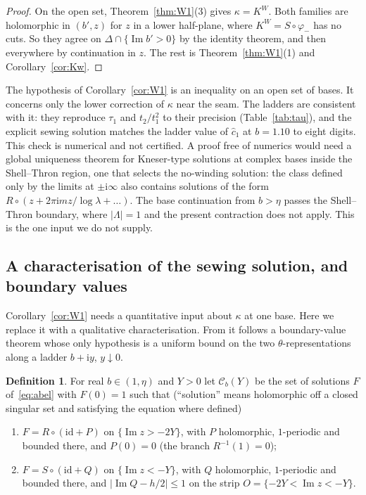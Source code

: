 \documentclass[11pt,a4paper]{article}
\theoremstyle{definition}
\newtheorem{definition}[theorem]{Definition}
\newcommand{\Rr}{R}
\newcommand{\Kk}{K}
\newcommand{\ii}{\mathrm{i}}
\begin{document}
\begin{proof}
On the open set, Theorem~\ref{thm:W1}(3) gives $\kappa=\Kk^W$.  Both families
are holomorphic in $(b',z)$ for $z$ in a lower half-plane, where $\Kk^W=S\circ\varphi_-$
has no cuts.  So they agree on $\Delta\cap\{\operatorname{Im}b'>0\}$ by the
identity theorem, and then everywhere by continuation in $z$.  The rest is Theorem~\ref{thm:W1}(1) and
Corollary~\ref{cor:Kw}.
\end{proof}

The hypothesis of Corollary~\ref{cor:W1} is an inequality on an open set of bases.  It
concerns only the lower correction of $\kappa$ near the seam.  The ladders
are consistent with it: they reproduce $\tau_1$ and $t_2/t_1^2$ to their
precision (Table~\ref{tab:tau}), and the explicit sewing solution matches the
ladder value of $\hat c_1$ at $b=1.10$ to eight digits.  This check is
numerical and not certified.  A proof free of numerics would need a global uniqueness theorem
for Kneser-type solutions at complex bases inside the Shell--Thron region,
one that selects the no-winding solution: the class defined only by the limits
at $\pm\ii\infty$ also contains solutions of the form
$\Rr\circ(z+2\pi\ii mz/\log\lambda+\ldots)$.  The base continuation from
$b>\eta$ passes the Shell--Thron boundary, where $|\Lambda|=1$ and the present
contraction does not apply.  This is the one input we do not supply.

\subsection{A characterisation of the sewing solution, and boundary values}\label{sec:char}

Corollary~\ref{cor:W1} needs a quantitative input about $\kappa$ at one base.
Here we replace it with a qualitative characterisation.  From it follows a
boundary-value theorem whose only hypothesis is a uniform bound on the two
$\theta$-representations along a ladder $b+\ii y$, $y\downarrow0$.

\begin{definition}\label{def:class}
For real $b\in(1,\eta)$ and $Y>0$ let $\mathcal C_b(Y)$ be the set of
solutions $F$ of~\eqref{eq:abel} with $F(0)=1$ such that
(``solution'' means holomorphic off a closed singular set and satisfying the
equation where defined)
\begin{enumerate}
\item[(a)] $F=\Rr\circ(\mathrm{id}+P)$ on $\{\operatorname{Im}z>-2Y\}$, with $P$
  holomorphic, $1$-periodic and bounded there, and $P(0)=0$ (the branch
  $\Rr^{-1}(1)=0$);
\item[(b)] $F=S\circ(\mathrm{id}+Q)$ on $\{\operatorname{Im}z<-Y\}$, with $Q$
  holomorphic, $1$-periodic and bounded there, and
  $|\operatorname{Im}Q-h/2|\le1$ on the strip $O=\{-2Y<\operatorname{Im}z<-Y\}$.
\end{enumerate}
\end{definition}
\end{document}
